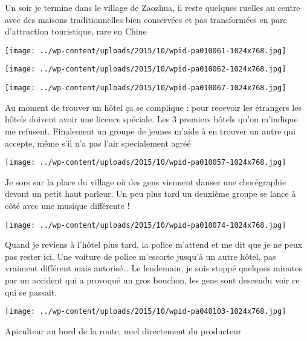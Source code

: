  \newline
 Un soir je termine dans le village de Zaozhua, il reste quelques ruelles au centre avec des maisons traditionnelles bien conservées et pas transformées en parc d'attraction touristique, rare en Chine \newline
 \newline
\centerline{\texttt{[image: ../wp-content/uploads/2015/10/wpid-pa010061-1024x768.jpg]} } 
 \newline
 \newline
\centerline{\texttt{[image: ../wp-content/uploads/2015/10/wpid-pa010062-1024x768.jpg]} } 
 \newline
 \newline
\centerline{\texttt{[image: ../wp-content/uploads/2015/10/wpid-pa010067-1024x768.jpg]} } 
 \newline
 Au moment de trouver un hôtel ça se complique : pour recevoir les étrangers les hôtels doivent avoir une licence spéciale. Les 3 premiers hôtels qu'on m'indique me refusent. \newline
 Finalement un groupe de jeunes m'aide à en trouver un autre qui accepte, même s'il n'a pas l'air specialement agréé \newline
 \newline
\centerline{\texttt{[image: ../wp-content/uploads/2015/10/wpid-pa010057-1024x768.jpg]} } 
 \newline
 Je sors sur la place du village où des gens viennent danser une chorégraphie devant un petit haut parleur. Un peu plus tard un deuxième groupe se lance à côté avec une musique différente ! \newline
 \newline
\centerline{\texttt{[image: ../wp-content/uploads/2015/10/wpid-pa010074-1024x768.jpg]} } 
 \newline
 Quand je reviens à l'hôtel plus tard, la police m'attend et me dit que je ne peux pas rester ici. Une voiture de police m'escorte jusqu'à un autre hôtel, pas vraiment différent mais autorisé… \newline
 Le lendemain, je suis stoppé quelques minutes par un accident qui a provoqué un gros bouchon, les gens sont descendu voir ce qui se passait. \newline
 \newline
\centerline{\texttt{[image: ../wp-content/uploads/2015/10/wpid-pa040103-1024x768.jpg]} } 
 \newline
 Apiculteur au bord de la route, miel directement du producteur \newline
